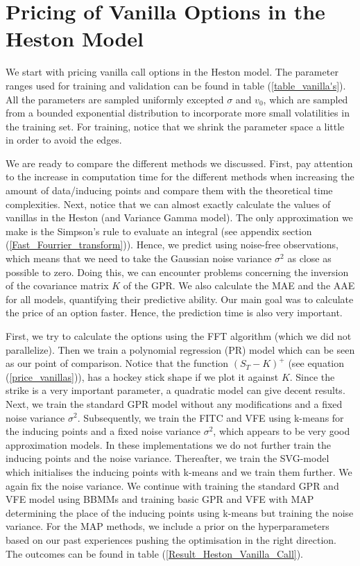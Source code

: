 \documentclass[12pt,a4paper,oneside]{book}
\begin{document}
\section{Pricing of Vanilla Options in the Heston Model}

We start with pricing vanilla call options in the Heston model. The parameter ranges used for training and validation can be found in table (\ref{table_vanilla's}). All the parameters are sampled uniformly excepted $\sigma$ and $v_0$, which are sampled from a bounded exponential distribution to incorporate more small volatilities in the training set. For training, notice that we shrink the parameter space a little in order to avoid the edges.

We are ready to compare the different methods we discussed. First, pay attention to the increase in computation time for the different methods when increasing the amount of data/inducing points and compare them with the theoretical time complexities. Next, notice that we can almost exactly calculate the values of vanillas in the Heston (and Variance Gamma model). The only approximation we make is the Simpson's rule to evaluate an integral (see appendix section (\ref{Fast_Fourrier_transform})). Hence, we predict using noise-free observations, which means that we need to take the Gaussian noise variance $\sigma^2$ as close as possible to zero. Doing this, we can encounter problems concerning the inversion of the covariance matrix $K$ of the GPR. We also calculate the MAE and the AAE for all models, quantifying their predictive ability. Our main goal was to calculate the price of an option faster. Hence, the prediction time is also very important. 

First, we try to calculate the options using the FFT algorithm (which we did not parallelize). Then we train a polynomial regression (PR) model which can be seen as our point of comparison. Notice that the function $(S_T - K)^{+}$ (see equation (\ref{price_vanillas})), has a hockey stick shape if we plot it against $K$. Since the strike is a very important parameter, a quadratic model can give decent results. Next, we train the standard GPR model without any modifications and a fixed noise variance $\sigma^2$. Subsequently, we train the FITC and VFE using k-means for the inducing points and a fixed noise variance $\sigma^2$, which appears to be very good approximation models. In these implementations we do not further train the inducing points and the noise variance. Thereafter, we train the SVG-model which initialises the inducing points with k-means and we train them further. We again fix the noise variance. We continue with training the standard GPR and VFE model using BBMMs and training basic GPR and VFE with MAP determining the place of the inducing points using k-means but training the noise variance. For the MAP methods, we include a prior on the hyperparameters based on our past experiences pushing the optimisation in the right direction. The outcomes can be found in table (\ref{Result_Heston_Vanilla_Call}).
\end{document}
